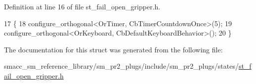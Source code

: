 Definition at line 16 of file st\+\_\+fail\+\_\+open\+\_\+gripper.\+h.


\begin{DoxyCode}
17     \{
18         configure\_orthogonal<OrTimer,  CbTimerCountdownOnce>(5);    
19         configure\_orthogonal<OrKeyboard, CbDefaultKeyboardBehavior>();
20     \}
\end{DoxyCode}


The documentation for this struct was generated from the following file\+:\begin{DoxyCompactItemize}
\item 
smacc\+\_\+sm\+\_\+reference\+\_\+library/sm\+\_\+pr2\+\_\+plugs/include/sm\+\_\+pr2\+\_\+plugs/states/\hyperlink{st__fail__open__gripper_8h}{st\+\_\+fail\+\_\+open\+\_\+gripper.\+h}\end{DoxyCompactItemize}

